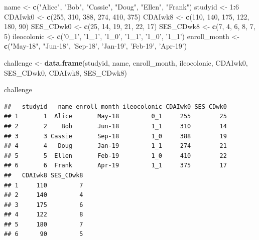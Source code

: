 \documentclass[
]{book}
\newenvironment{Shaded}{\begin{snugshade}}{\end{snugshade}}
\newcommand{\DecValTok}[1]{\textcolor[rgb]{0.00,0.00,0.81}{#1}}
\newcommand{\KeywordTok}[1]{\textcolor[rgb]{0.13,0.29,0.53}{\textbf{#1}}}
\newcommand{\NormalTok}[1]{#1}
\newcommand{\OperatorTok}[1]{\textcolor[rgb]{0.81,0.36,0.00}{\textbf{#1}}}
\newcommand{\StringTok}[1]{\textcolor[rgb]{0.31,0.60,0.02}{#1}}
\begin{document}
\begin{Shaded}
\begin{Highlighting}[]
\NormalTok{name <-}\StringTok{ }\KeywordTok{c}\NormalTok{(}\StringTok{"Alice"}\NormalTok{, }\StringTok{"Bob"}\NormalTok{, }\StringTok{"Cassie"}\NormalTok{, }\StringTok{"Doug"}\NormalTok{, }\StringTok{"Ellen"}\NormalTok{, }\StringTok{"Frank"}\NormalTok{)}
\NormalTok{studyid <-}\StringTok{ }\DecValTok{1}\OperatorTok{:}\DecValTok{6}
\NormalTok{CDAIwk0 <-}\StringTok{ }\KeywordTok{c}\NormalTok{(}\DecValTok{255}\NormalTok{, }\DecValTok{310}\NormalTok{, }\DecValTok{388}\NormalTok{, }\DecValTok{274}\NormalTok{, }\DecValTok{410}\NormalTok{, }\DecValTok{375}\NormalTok{)}
\NormalTok{CDAIwk8 <-}\StringTok{ }\KeywordTok{c}\NormalTok{(}\DecValTok{110}\NormalTok{, }\DecValTok{140}\NormalTok{, }\DecValTok{175}\NormalTok{, }\DecValTok{122}\NormalTok{, }\DecValTok{180}\NormalTok{, }\DecValTok{90}\NormalTok{)}
\NormalTok{SES_CDwk0 <-}\StringTok{ }\KeywordTok{c}\NormalTok{(}\DecValTok{25}\NormalTok{, }\DecValTok{14}\NormalTok{, }\DecValTok{19}\NormalTok{, }\DecValTok{21}\NormalTok{, }\DecValTok{22}\NormalTok{, }\DecValTok{17}\NormalTok{)}
\NormalTok{SES_CDwk8 <-}\StringTok{ }\KeywordTok{c}\NormalTok{(}\DecValTok{7}\NormalTok{, }\DecValTok{4}\NormalTok{, }\DecValTok{6}\NormalTok{, }\DecValTok{8}\NormalTok{, }\DecValTok{7}\NormalTok{, }\DecValTok{5}\NormalTok{)}
\NormalTok{ileocolonic <-}\StringTok{ }\KeywordTok{c}\NormalTok{(}\StringTok{'0_1'}\NormalTok{, }\StringTok{'1_1'}\NormalTok{, }\StringTok{'1_0'}\NormalTok{, }\StringTok{'1_1'}\NormalTok{, }\StringTok{'1_0'}\NormalTok{, }\StringTok{'1_1'}\NormalTok{)}
\NormalTok{enroll_month <-}\StringTok{ }\KeywordTok{c}\NormalTok{(}\StringTok{"May-18"}\NormalTok{, }\StringTok{"Jun-18"}\NormalTok{, }\StringTok{'Sep-18'}\NormalTok{, }\StringTok{'Jan-19'}\NormalTok{, }\StringTok{'Feb-19'}\NormalTok{, }\StringTok{'Apr-19'}\NormalTok{)}

\NormalTok{challenge <-}\StringTok{ }\KeywordTok{data.frame}\NormalTok{(studyid, name, enroll_month, ileocolonic, CDAIwk0, SES_CDwk0, CDAIwk8, SES_CDwk8)}

\NormalTok{challenge}
\end{Highlighting}
\end{Shaded}

\begin{verbatim}
##   studyid   name enroll_month ileocolonic CDAIwk0 SES_CDwk0
## 1       1  Alice       May-18         0_1     255        25
## 2       2    Bob       Jun-18         1_1     310        14
## 3       3 Cassie       Sep-18         1_0     388        19
## 4       4   Doug       Jan-19         1_1     274        21
## 5       5  Ellen       Feb-19         1_0     410        22
## 6       6  Frank       Apr-19         1_1     375        17
##   CDAIwk8 SES_CDwk8
## 1     110         7
## 2     140         4
## 3     175         6
## 4     122         8
## 5     180         7
## 6      90         5
\end{verbatim}
\end{document}
